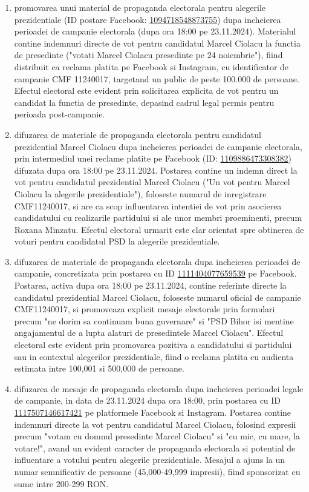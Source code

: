 \documentclass[a4paper,12pt]{article}
\begin{document}
\begin{enumerate}[leftmargin=*, label=\arabic*.)]
    \item promovarea unui material de propaganda electorala pentru alegerile prezidentiale (ID postare Facebook: \href{https://www.facebook.com/ads/library/?id=1094718548873755}{1094718548873755}) dupa incheierea perioadei de campanie electorala (dupa ora 18:00 pe 23.11.2024). Materialul contine indemnuri directe de vot pentru candidatul Marcel Ciolacu la functia de presedinte ("votati Marcel Ciolacu presedinte pe 24 noiembrie"), fiind distribuit ca reclama platita pe Facebook si Instagram, cu identificator de campanie CMF 11240017, targetand un public de peste 100.000 de persoane. Efectul electoral este evident prin solicitarea explicita de vot pentru un candidat la functia de presedinte, depasind cadrul legal permis pentru perioada post-campanie.
    \item difuzarea de materiale de propaganda electorala pentru candidatul prezidential Marcel Ciolacu dupa incheierea perioadei de campanie electorala, prin intermediul unei reclame platite pe Facebook (ID: \href{https://www.facebook.com/ads/library/?id=1109886473308382}{1109886473308382}) difuzata dupa ora 18:00 pe 23.11.2024. Postarea contine un indemn direct la vot pentru candidatul prezidential Marcel Ciolacu ("Un vot pentru Marcel Ciolacu la alegerile prezidentiale"), foloseste numarul de inregistrare CMF11240017, si are ca scop influentarea intentiei de vot prin asocierea candidatului cu realizarile partidului si ale unor membri proeminenti, precum Roxana Minzatu. Efectul electoral urmarit este clar orientat spre obtinerea de voturi pentru candidatul PSD la alegerile prezidentiale.
    \item difuzarea de materiale de propaganda electorala dupa incheierea perioadei de campanie, concretizata prin postarea cu ID \href{https://www.facebook.com/ads/library/?id=1111404077659539}{1111404077659539} pe Facebook. Postarea, activa dupa ora 18:00 pe 23.11.2024, contine referinte directe la candidatul prezidential Marcel Ciolacu, foloseste numarul oficial de campanie CMF11240017, si promoveaza explicit mesaje electorale prin formulari precum "ne dorim sa continuam buna guvernare" si "PSD Bihor isi mentine angajamentul de a lupta alaturi de presedintele Marcel Ciolacu". Efectul electoral este evident prin promovarea pozitiva a candidatului si partidului sau in contextul alegerilor prezidentiale, fiind o reclama platita cu audienta estimata intre 100,001 si 500,000 de persoane.
    \item difuzarea de mesaje de propaganda electorala dupa incheierea perioadei legale de campanie, in data de 23.11.2024 dupa ora 18:00, prin postarea cu ID \href{https://www.facebook.com/ads/library/?id=1117507146617421}{1117507146617421} pe platformele Facebook si Instagram. Postarea contine indemnuri directe la vot pentru candidatul Marcel Ciolacu, folosind expresii precum "votam cu domnul presedinte Marcel Ciolacu" si "cu mic, cu mare, la votare!", avand un evident caracter de propaganda electorala si potential de influentare a votului pentru alegerile prezidentiale. Mesajul a ajuns la un numar semnificativ de persoane (45,000-49,999 impresii), fiind sponsorizat cu sume intre 200-299 RON.

\end{enumerate}
\end{document}
